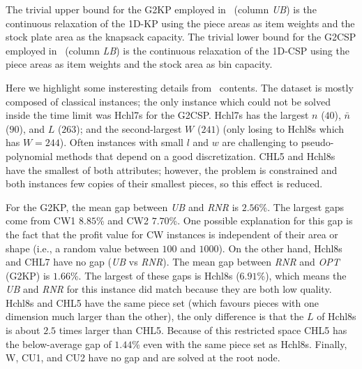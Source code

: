 \documentclass[9pt]{entcs}
\begin{document}
The trivial upper bound for the G2KP employed in~ (column \emph{UB}) is the continuous relaxation of the 1D-KP using the piece areas as item weights and the stock plate area as the knapsack capacity. %
The trivial lower bound for the G2CSP employed in~ (column \emph{LB}) is the continuous relaxation of the 1D-CSP using the piece areas as item weights and the stock area as bin capacity. %

Here we highlight some insteresting details from~ contents.
The dataset is mostly composed of classical instances; the only instance which could not be solved inside the time limit was Hchl7s for the G2CSP.
Hchl7s has the largest \(n\) (\(40\)), \(\bar{n}\) (\(90\)), and \(L\) (\(263\)); and the second-largest \(W\) (\(241\)) (only losing to Hchl8s which has \(W = 244\)).
Often instances with small \underline{\(l\)} and \underline{\(w\)} are challenging to pseudo-polynomial methods that depend on a good discretization.
CHL5 and Hchl8s have the smallest of both attributes; however, the problem is constrained and both instances few copies of their smallest pieces, so this effect is reduced.

For the G2KP, the mean gap between \emph{UB} and \emph{RNR} is \(2.56\)\%. The largest gaps come from CW1 \(8.85\)\% and CW2 \(7.70\)\%.
One possible explanation for this gap is the fact that the profit value for CW instances is independent of their area or shape (i.e., a random value between \(100\) and \(1000\)).
On the other hand, Hchl8s and CHL7 have no gap (\emph{UB} vs \emph{RNR}).
The mean gap between \emph{RNR} and \emph{OPT} (G2KP) is \(1.66\)\%.
The largest of these gaps is Hchl8s (\(6.91\)\%), which means the \emph{UB} and \emph{RNR} for this instance did match because they are both low quality.
Hchl8s and CHL5 have the same piece set (which favours pieces with one dimension much larger than the other), the only difference is that the \(L\) of Hchl8s is about \(2.5\) times larger than CHL5.
Because of this restricted space CHL5 has the below-average gap of \(1.44\)\% even with the same piece set as Hchl8s.
Finally, W, CU1, and CU2 have no gap and are solved at the root node.
\end{document}
